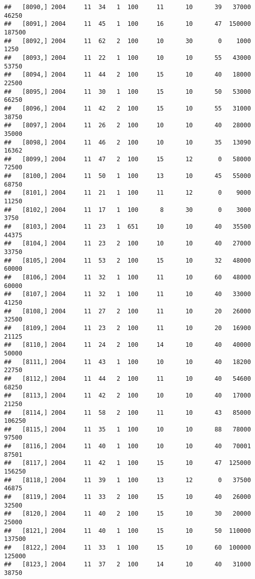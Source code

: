 \documentclass{article}\usepackage[]{graphicx}\usepackage[]{color}
\makeatletter
\newenvironment{kframe}{%
 \def\at@end@of@kframe{}%
 \ifinner\ifhmode%
  \def\at@end@of@kframe{\end{minipage}}%
  \begin{minipage}{\columnwidth}%
 \fi\fi%
 \def\FrameCommand##1{\hskip\@totalleftmargin \hskip-\fboxsep
 \colorbox{shadecolor}{##1}\hskip-\fboxsep
     \hskip-\linewidth \hskip-\@totalleftmargin \hskip\columnwidth}%
 \MakeFramed {\advance\hsize-\width
   \@totalleftmargin\z@ \linewidth\hsize
   \@setminipage}}%
 {\par\unskip\endMakeFramed%
 \at@end@of@kframe}
\newenvironment{knitrout}{}{} %
\makeatother
\begin{document}
\begin{knitrout}
\begin{kframe}
\begin{verbatim}
##   [8090,] 2004     11  34   1  100     11      10      39   37000   46250
##   [8091,] 2004     11  45   1  100     16      10      47  150000  187500
##   [8092,] 2004     11  62   2  100     10      30       0    1000    1250
##   [8093,] 2004     11  22   1  100     10      10      55   43000   53750
##   [8094,] 2004     11  44   2  100     15      10      40   18000   22500
##   [8095,] 2004     11  30   1  100     15      10      50   53000   66250
##   [8096,] 2004     11  42   2  100     15      10      55   31000   38750
##   [8097,] 2004     11  26   2  100     10      10      40   28000   35000
##   [8098,] 2004     11  46   2  100     10      10      35   13090   16362
##   [8099,] 2004     11  47   2  100     15      12       0   58000   72500
##   [8100,] 2004     11  50   1  100     13      10      45   55000   68750
##   [8101,] 2004     11  21   1  100     11      12       0    9000   11250
##   [8102,] 2004     11  17   1  100      8      30       0    3000    3750
##   [8103,] 2004     11  23   1  651     10      10      40   35500   44375
##   [8104,] 2004     11  23   2  100     10      10      40   27000   33750
##   [8105,] 2004     11  53   2  100     15      10      32   48000   60000
##   [8106,] 2004     11  32   1  100     11      10      60   48000   60000
##   [8107,] 2004     11  32   1  100     11      10      40   33000   41250
##   [8108,] 2004     11  27   2  100     11      10      20   26000   32500
##   [8109,] 2004     11  23   2  100     11      10      20   16900   21125
##   [8110,] 2004     11  24   2  100     14      10      40   40000   50000
##   [8111,] 2004     11  43   1  100     10      10      40   18200   22750
##   [8112,] 2004     11  44   2  100     11      10      40   54600   68250
##   [8113,] 2004     11  42   2  100     10      10      40   17000   21250
##   [8114,] 2004     11  58   2  100     11      10      43   85000  106250
##   [8115,] 2004     11  35   1  100     10      10      88   78000   97500
##   [8116,] 2004     11  40   1  100     10      10      40   70001   87501
##   [8117,] 2004     11  42   1  100     15      10      47  125000  156250
##   [8118,] 2004     11  39   1  100     13      12       0   37500   46875
##   [8119,] 2004     11  33   2  100     15      10      40   26000   32500
##   [8120,] 2004     11  40   2  100     15      10      30   20000   25000
##   [8121,] 2004     11  40   1  100     15      10      50  110000  137500
##   [8122,] 2004     11  33   1  100     15      10      60  100000  125000
##   [8123,] 2004     11  37   2  100     14      10      40   31000   38750

\end{verbatim}
\end{kframe}
\end{knitrout}
\end{document}
